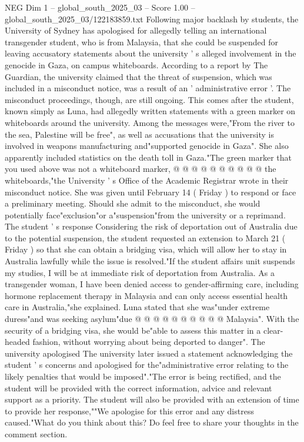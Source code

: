 \begin{textsample}{NEG Dim 1 – global\_south\_2025\_03 – Score 1.00 – global\_south\_2025\_03/122183859.txt}  \label{ex:f1_neg_185}
Following major backlash by students, the University of Sydney has apologised for allegedly telling an international transgender student, who is from Malaysia, that she could be suspended for leaving accusatory statements about the university ' s alleged involvement in the genocide in Gaza, on campus whiteboards.
According to a report by The Guardian, the university claimed that the threat of suspension, which was included in a misconduct notice, was a result of an ' administrative error '.
The misconduct proceedings, though, are still ongoing.
This comes after the student, known simply as Luna, had allegedly written statements with a green marker on whiteboards around the university.
Among the messages were,"From the river to the sea, Palestine will be free", as well as accusations that the university is involved in weapons manufacturing and"supported genocide in Gaza".
She also apparently included statistics on the death toll in Gaza."The green marker that you used above was not a whiteboard marker, @ @ @ @ @ @ @ @ @ @ the whiteboards,"the University ' s Office of the Academic Registrar wrote in their misconduct notice.
She was given until February 14 ( Friday ) to respond or face a preliminary meeting.
Should she admit to the misconduct, she would potentially face"exclusion"or a"suspension"from the university or a reprimand.
The student ' s response Considering the risk of deportation out of Australia due to the potential suspension, the student requested an extension to March 21 ( Friday ) so that she can obtain a bridging visa, which will allow her to stay in Australia lawfully while the issue is resolved."If the student affairs unit suspends my studies, I will be at immediate risk of deportation from Australia.
As a transgender woman, I have been denied access to gender-affirming care, including hormone replacement therapy in Malaysia and can only access essential health care in Australia,"she explained.
Luna stated that she was"under extreme duress"and was seeking asylum"due @ @ @ @ @ @ @ @ @ @ Malaysia".
With the security of a bridging visa, she would be"able to assess this matter in a clear-headed fashion, without worrying about being deported to danger".
The university apologised The university later issued a statement acknowledging the student ' s concerns and apologised for the"administrative error relating to the likely penalties that would be imposed"."The error is being rectified, and the student will be provided with the correct information, advice and relevant support as a priority.
The student will also be provided with an extension of time to provide her response,""We apologise for this error and any distress caused."What do you think about this?
Do feel free to share your thoughts in the comment section.

\end{textsample}
